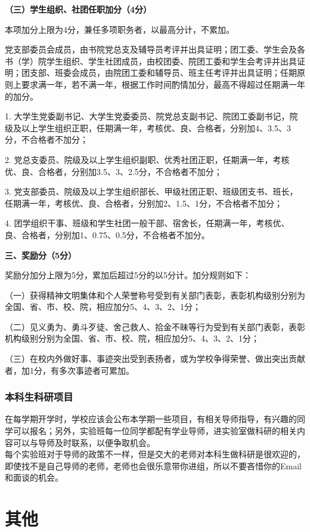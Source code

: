 \documentclass[
decoration,  %
]{qyxf-book}
\begin{document}
\textbf{（三）学生组织、社团任职加分（4分）}

本项加分上限为4分，兼任多项职务者，以最高分计，不累加。

党支部委员会成员，由书院党总支及辅导员考评并出具证明；团工委、学生会及各书（学）院学生组织、学生社团成员，由校团委、院团工委和学生会考评并出具证明；团支部、班委会成员，由院团工委和辅导员、班主任考评并出具证明；任期原则上要求满一年，若不满一年，根据工作时间酌情加分，最高不得超过任期满一年的加分。

1. 大学生党委副书记、大学生党委委员、院党总支副书记、院团工委副书记，院级及以上学生组织正职，任期满一年，考核优、良、合格者，分别加4、3.5、3分，不合格者不加分；

2. 党总支委员、院级及以上学生组织副职、优秀社团正职，任期满一年，考核优、良、合格者，分别加3.5、3、2.5分，不合格者不加分； 

3. 党支部委员、院级及以上学生组织部长、甲级社团正职、班级团支书、班长，任期满一年，考核优、良、合格者，分别加2、1.5、1分，不合格者不加分；

4. 团学组织干事、班级和学生社团一般干部、宿舍长，任期满一年，考核优、良、合格者，分别加1、0.75、0.5分，不合格者不加分。

\textbf{三、奖励分（5分）}

奖励分加分上限为5分，累加后超过5分的以5分计。加分规则如下：

（一）获得精神文明集体和个人荣誉称号受到有关部门表彰，表彰机构级别分别为全国、省、市、校、院，相应加分5、4、3、2、1分；

（二）见义勇为、勇斗歹徒、舍己救人、拾金不昧等行为受到有关部门表彰，表彰机构级别分别为全国、省、市、校、院，相应加分5、4、3、2、1分；

（三）在校内外做好事、事迹突出受到表扬者，或为学校争得荣誉、做出突出贡献者，加1分，有多次事迹者可累加。

\subsection{本科生科研项目}
\noindent 在每学期开学时，学校应该会公布本学期一些项目，有相关导师指导，有兴趣的同学可以报名；另外，实验班每一位同学都配有学业导师，进实验室做科研的相关内容可以与导师及时联系，以便争取机会。\\
每个实验班对于导师的政策不一样，但是交大的老师对本科生做科研是很欢迎的，即使找不是自己导师的老师，老师也会很乐意带你进组，所以不要吝惜你的Email和面谈的机会。

\newpage
\chapter{其他}
\end{document}
